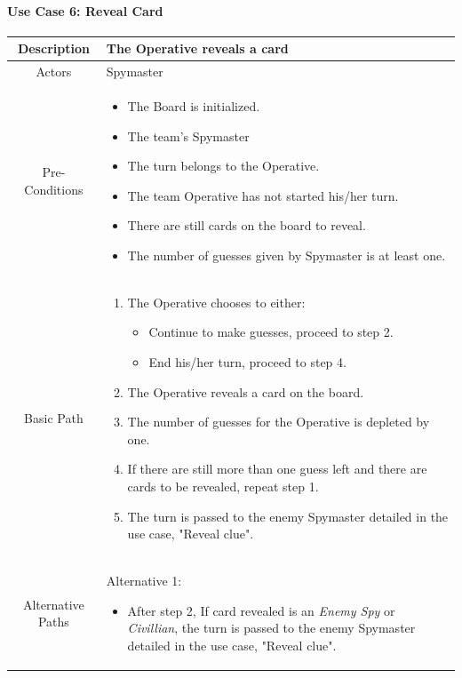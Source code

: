 \documentclass[10pt, a4paper]{article}
\begin{document}
	\newpage
		
	\paragraph{Use Case 6: Reveal Card}
	\begin{center}
		\begin{tabular}{ |c|p{10cm}| } 
			\hline
			Description & The Operative reveals a card \\ 
			\hline
			Actors & Spymaster \\
			\hline 
			Pre-Conditions & \begin{itemize}[noitemsep,topsep=0pt]
				\item The Board is initialized.
				\item The team's Spymaster 
				\item The turn belongs to the Operative.
				\item The team Operative has not started his/her turn.
				\item There are still cards on the board to reveal.
				\item The number of guesses given by Spymaster is at least one.
			\end{itemize} \\
			\hline
			Basic Path & 
			\begin{enumerate}
				\item The Operative chooses to either:
				\begin{itemize}
					\item Continue to make guesses, proceed to step 2.
					\item End his/her turn, proceed to step 4.
				\end{itemize}
				\item The Operative reveals a card on the board.
				\item The number of guesses for the Operative is depleted by one.
				\item If there are still more than one guess left and there are cards to be revealed, repeat step 1.
				\item The turn is passed to the enemy Spymaster detailed in the use case, "Reveal clue". 
			\end{enumerate} \\
			\hline 
			Alternative Paths & 
			Alternative 1:
				\begin{itemize}[noitemsep,topsep=0pt]
					\item After step 2, If card revealed is an \textit{Enemy Spy} or \textit{Civillian}, the turn is passed to the enemy Spymaster detailed in the use case, "Reveal clue".

\end{itemize}
\end{tabular}
\end{center}
\end{document}
